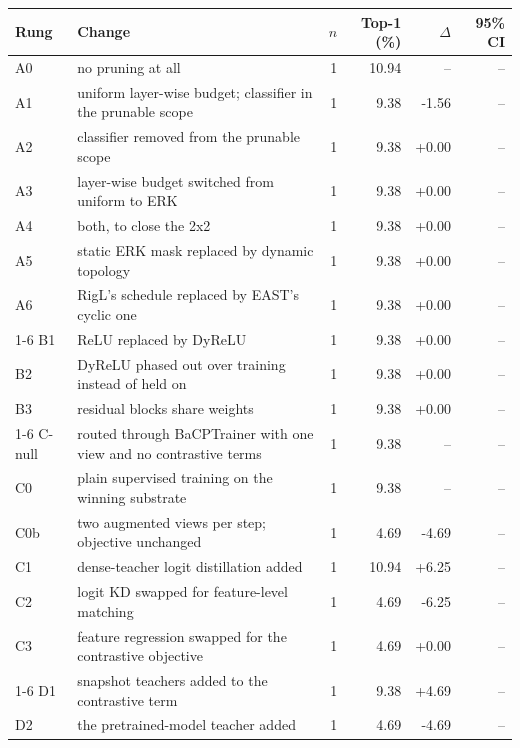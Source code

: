 \begin{table}[t]
\centering
\small
\begin{tabular}{llrrrr}
\toprule
Rung & Change & $n$ & Top-1 (\%) & $\Delta$ & 95\% CI \\
\midrule
A0 & no pruning at all & 1 & 10.94 & -- & -- \\
A1 & uniform layer-wise budget; classifier in the prunable scope & 1 & 9.38 & -1.56 & -- \\
A2 & classifier removed from the prunable scope & 1 & 9.38 & +0.00 & -- \\
A3 & layer-wise budget switched from uniform to ERK & 1 & 9.38 & +0.00 & -- \\
A4 & both, to close the 2x2 & 1 & 9.38 & +0.00 & -- \\
A5 & static ERK mask replaced by dynamic topology & 1 & 9.38 & +0.00 & -- \\
A6 & RigL's schedule replaced by EAST's cyclic one & 1 & 9.38 & +0.00 & -- \\
\cmidrule(lr){1-6}
B1 & ReLU replaced by DyReLU & 1 & 9.38 & +0.00 & -- \\
B2 & DyReLU phased out over training instead of held on & 1 & 9.38 & +0.00 & -- \\
B3 & residual blocks share weights & 1 & 9.38 & +0.00 & -- \\
\cmidrule(lr){1-6}
C-null & routed through BaCPTrainer with one view and no contrastive terms & 1 & 9.38 & -- & -- \\
C0 & plain supervised training on the winning substrate & 1 & 9.38 & -- & -- \\
C0b & two augmented views per step; objective unchanged & 1 & 4.69 & -4.69 & -- \\
C1 & dense-teacher logit distillation added & 1 & 10.94 & +6.25 & -- \\
C2 & logit KD swapped for feature-level matching & 1 & 4.69 & -6.25 & -- \\
C3 & feature regression swapped for the contrastive objective & 1 & 4.69 & +0.00 & -- \\
\cmidrule(lr){1-6}
D1 & snapshot teachers added to the contrastive term & 1 & 9.38 & +4.69 & -- \\
D2 & the pretrained-model teacher added & 1 & 4.69 & -4.69 & -- \\

\end{tabular}
\end{table}
